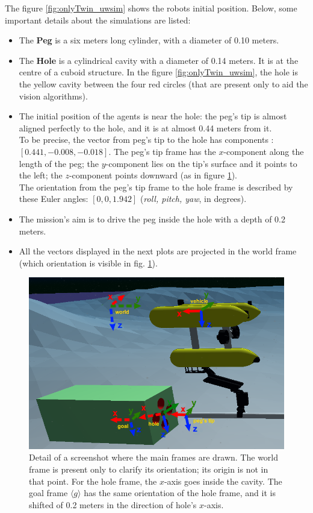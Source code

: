 The figure \ref{fig:onlyTwin_uwsim} shows the robots initial position. Below, some important details about the simulations are listed:
\begin{itemize}
	\item The \textbf{Peg} is a six meters long cylinder, with a diameter of 0.10 meters.
	\item The \textbf{Hole} is a cylindrical cavity with a diameter of 0.14 meters. It is at the centre of a cuboid structure. In the figure \ref{fig:onlyTwin_uwsim}, the hole is the yellow cavity between the four red circles (that are present only to aid the vision algorithms).
	\item The initial position of the agents is near the hole: the peg's tip is almost aligned perfectly to the hole, and it is at almost 0.44 meters from it.\\
	To be precise, the vector from peg's tip to the hole has components :\\ $[0.441, -0.008, -0.018]$. The peg's tip frame has the $x$-component along the length of the peg; the \mbox{$y$-component} lies on the tip's surface and it points to the left; the $z$-component points downward (as in figure \ref{fig:scenario_frames}).\\
	The orientation from the peg's tip frame to the hole frame is described by these Euler angles: $[0, 0, 1.942]$ (\textit{roll, pitch, yaw}, in degrees).
	\item The mission's aim is to drive the peg inside the hole with a depth of 0.2 meters.
	\item All the vectors displayed in the next plots are projected in the world frame (which orientation is visible in fig. \ref{fig:scenario_frames}).
\end{itemize}
\begin{figure}[H]
	\centering
	\includegraphics[width=12.5cm]{scenario_framesCrop.png}	
	\caption[Main frames of the insertion phase]{Detail of a screenshot where the main frames are drawn. The world frame is present only to clarify its orientation; its origin is not in that point. For the hole frame, the $x$-axis goes inside the cavity. The goal frame $\langle g \rangle$ has the same orientation of the hole frame, and it is shifted of 0.2 meters in the direction of hole's $x$-axis.}
	\label{fig:scenario_frames}
\end{figure}


